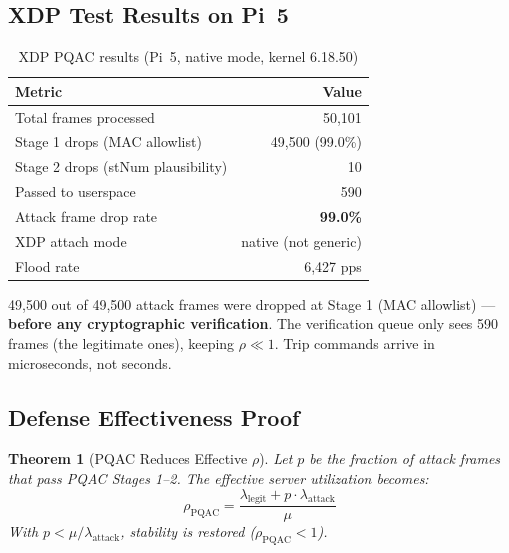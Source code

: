 \documentclass[11pt,a4paper,twocolumn]{article}
\newtheorem{theorem}{Theorem}
\begin{document}
\subsection{XDP Test Results on Pi~5}

\begin{table}[H]
\centering
\caption{XDP PQAC results (Pi~5, native mode, kernel 6.18.50)}
\label{tab:xdp}
\scriptsize
\begin{tabular}{@{}lr@{}}
\toprule
\textbf{Metric} & \textbf{Value} \\
\midrule
Total frames processed & 50{,}101 \\
Stage 1 drops (MAC allowlist) & 49{,}500 (99.0\%) \\
Stage 2 drops (stNum plausibility) & 10 \\
Passed to userspace & 590 \\
Attack frame drop rate & \textbf{99.0\%} \\
XDP attach mode & native (not generic) \\
Flood rate & 6{,}427 pps \\
\bottomrule
\end{tabular}
\end{table}

\begin{keyinsight}
49{,}500 out of 49{,}500 attack frames were dropped at Stage 1 (MAC allowlist) --- \textbf{before any cryptographic verification}. The verification queue only sees 590 frames (the legitimate ones), keeping $\rho \ll 1$. Trip commands arrive in microseconds, not seconds.
\end{keyinsight}

\subsection{Defense Effectiveness Proof}

\begin{theorem}[PQAC Reduces Effective $\rho$]
Let $p$ be the fraction of attack frames that pass PQAC Stages 1--2. The effective server utilization becomes:
\begin{equation}
\rho_{\text{PQAC}} = \frac{\lambda_{\text{legit}} + p \cdot \lambda_{\text{attack}}}{\mu}
\end{equation}
With $p < \mu / \lambda_{\text{attack}}$, stability is restored ($\rho_{\text{PQAC}} < 1$).
\end{theorem}
\end{document}
